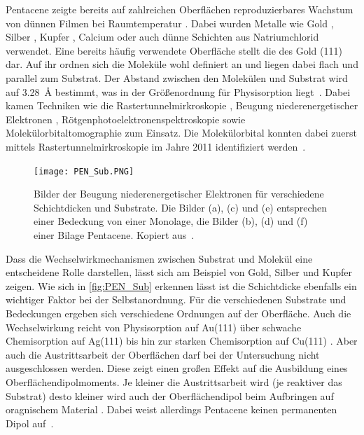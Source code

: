             Pentacene zeigte bereits auf zahlreichen Oberflächen reproduzierbares Wachstum von dünnen Filmen bei Raumtemperatur \cite{5A_9}.
            Dabei wurden Metalle wie Gold \cite{5A_6}, Silber \cite{5A_4}, Kupfer \cite{5A_1}, Calcium \cite{5A_5} oder auch dünne Schichten aus Natriumchlorid \cite{5A_10} verwendet.
            Eine bereits häufig verwendete Oberfläche stellt die des Gold (111) dar.
            Auf ihr ordnen sich die Moleküle wohl definiert an und liegen dabei flach und parallel zum Substrat.
            Der Abstand zwischen den Molekülen und Substrat wird auf \SI{3.28}{\angstrom} bestimmt, was in der Größenordnung für Physisorption liegt~\cite{5A_1}.
            Dabei kamen Techniken wie die Rastertunnelmirkroskopie \cite{5A_7}, Beugung niederenergetischer Elektronen \cite{5A_4}, Rötgenphotoelektronenspektroskopie \cite{5A_5} sowie Molekülorbitaltomographie zum Einsatz.
            Die Molekülorbital konnten dabei zuerst mittels Rastertunnelmirkroskopie im Jahre 2011 identifiziert werden~\cite{5A_10}.

            \begin{figure}
                \centering
                \texttt{[image: PEN\_Sub.PNG]}
                \caption{Bilder der Beugung niederenergetischer Elektronen für verschiedene Schichtdicken und Substrate.
                Die Bilder (a), (c) und (e) entsprechen einer Bedeckung von einer Monolage, die Bilder (b), (d) und (f) einer Bilage Pentacene.
                Kopiert aus~\cite{5A_4}.}
                \label{fig:PEN_Sub}
            \end{figure}
            Dass die Wechselwirkmechanismen zwischen Substrat und Molekül eine entscheidene Rolle darstellen, lässt sich am Beispiel von Gold, Silber und Kupfer zeigen.
            Wie sich in \autoref{fig:PEN_Sub} erkennen lässt ist die Schichtdicke ebenfalls ein wichtiger Faktor bei der Selbstanordnung.
            Für die verschiedenen Substrate und Bedeckungen ergeben sich verschiedene Ordnungen auf der Oberfläche.
            Auch die Wechselwirkung reicht von Physisorption auf Au(111) über schwache Chemisorption auf Ag(111) bis hin zur starken Chemisorption auf Cu(111) \cite{5A_4}.
            Aber auch die Austrittsarbeit der Oberflächen darf bei der Untersuchung nicht ausgeschlossen werden.
            Diese zeigt einen großen Effekt auf die Ausbildung eines Oberflächendipolmoments.
            Je kleiner die Austrittsarbeit wird (je reaktiver das Substrat) desto kleiner wird auch der Oberflächendipol beim Aufbringen auf oragnischem Material \cite{5A_5}. 
            Dabei weist allerdings Pentacene keinen permanenten Dipol auf~\cite{5A_4}.

